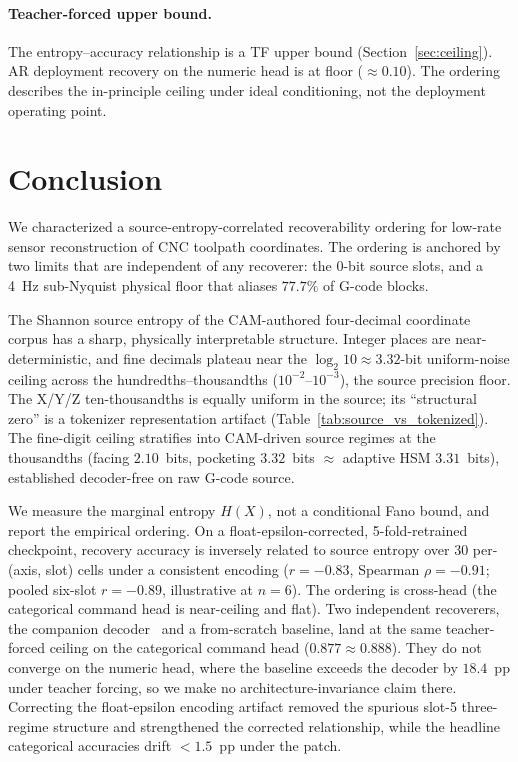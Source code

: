 \documentclass[entropy,article,submit,moreauthors,pdftex]{Definitions/mdpi}
\begin{document}
\paragraph{Teacher-forced upper bound.} The entropy--accuracy relationship is a TF upper bound (Section~\ref{sec:ceiling}). AR deployment recovery on the numeric head is at floor ($\approx\!0.10$). The ordering describes the in-principle ceiling under ideal conditioning, not the deployment operating point.

\section{Conclusion}
\label{sec:conclusion}

We characterized a source-entropy-correlated recoverability ordering for low-rate sensor reconstruction of CNC toolpath coordinates. The ordering is anchored by two limits that are independent of any recoverer: the $0$-bit source slots, and a 4~Hz sub-Nyquist physical floor that aliases $77.7\%$ of G-code blocks.

The Shannon source entropy of the CAM-authored four-decimal coordinate corpus has a sharp, physically interpretable structure. Integer places are near-deterministic, and fine decimals plateau near the $\log_2 10\approx 3.32$-bit uniform-noise ceiling across the hundredths--thousandths ($10^{-2}$--$10^{-3}$), the source precision floor. The X/Y/Z ten-thousandths is equally uniform in the source; its ``structural zero'' is a tokenizer representation artifact (Table~\ref{tab:source_vs_tokenized}). The fine-digit ceiling stratifies into CAM-driven source regimes at the thousandths (facing $2.10$~bits, pocketing $3.32$~bits $\approx$ adaptive HSM $3.31$~bits), established decoder-free on raw G-code source.

We measure the marginal entropy $H(X)$, not a conditional Fano bound, and report the empirical ordering. On a float-epsilon-corrected, 5-fold-retrained checkpoint, recovery accuracy is inversely related to source entropy over $30$ per-(axis, slot) cells under a consistent encoding ($r=-0.83$, Spearman $\rho=-0.91$; pooled six-slot $r=-0.89$, illustrative at $n\!=\!6$). The ordering is cross-head (the categorical command head is near-ceiling and flat). Two independent recoverers, the companion decoder~\cite{paperA_decoder} and a from-scratch baseline, land at the same teacher-forced ceiling on the categorical command head ($0.877\approx0.888$). They do not converge on the numeric head, where the baseline exceeds the decoder by $18.4$~pp under teacher forcing, so we make no architecture-invariance claim there. Correcting the float-epsilon encoding artifact removed the spurious slot-5 three-regime structure and strengthened the corrected relationship, while the headline categorical accuracies drift $<\!1.5$~pp under the patch.
\end{document}
